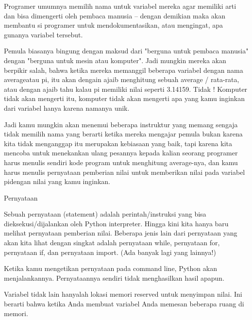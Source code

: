 \vspace{12pt}
\noindent 
Programer umumnya memilih nama untuk variabel mereka agar memiliki arti dan bisa dimengerti oleh pembaca manusia -- dengan demikian maka akan membantu si programer untuk mendokumentasikan, atau mengingat, apa gunanya variabel tersebut. \par
\vspace{12pt}
\vspace{12pt}
\noindent 
Pemula biasanya bingung dengan maksud dari "berguna untuk pembaca manusia" dengan "berguna untuk mesin atau komputer". Jadi mungkin mereka akan berpikir salah, bahwa ketika mereka memanggil beberapa variabel dengan nama $  $averageatau $  $pi, itu akan dengain ajaib menghitung sebuah average / rata-rata, atau dengan ajaib tahu kalau pi memiliki nilai seperti 3.14159. Tidak ! Komputer tidak akan mengerti itu, komputer tidak akan mengerti apa yang kamu inginkan dari variabel hanya karena namanya unik. \par
\vspace{12pt}
\noindent 
Jadi kamu mungkin akan menemui beberapa instruktur yang memang sengaja tidak memilih nama yang berarti ketika mereka mengajar pemula bukan karena kita tidak menganggap itu merupakan kebiasaan yang baik, tapi karena kita mencoba untuk menekankan ulang pesannya kepada kalian seorang programer  harus menulis sendiri kode program untuk menghitung average-nya, dan kamu harus menulis pernyataan pemberian nilai untuk memberikan nilai pada variabel $  $pidengan nilai yang kamu inginkan. \par
\vspace{12pt}
\noindent 
 Pernyataan \par
\vspace{12pt}
\noindent 
Sebuah $  $pernyataan $  $(statement) adalah perintah/instruksi yang bisa dieksekusi/dijalankan oleh Python interpreter. Hingga kini kita hanya baru melihat pernyataan pemberian nilai. Beberapa jenis lain dari pernyataan yang akan kita lihat dengan singkat adalah pernyataan $  $while, pernyataan $  $for, pernyataan $  $if, dan pernyataan $  $import. (Ada banyak lagi yang lainnya!) \par
\vspace{12pt}
\noindent 
Ketika kamu mengetikan pernyataan pada command line, Python akan menjalankannya. Pernyataannya sendiri tidak menghasilkan hasil apapun. \par
\vspace{12pt}
\noindent 
Variabel tidak lain hanyalah lokasi memori reserved untuk menyimpan nilai. $  $Ini berarti bahwa ketika Anda membuat variabel Anda memesan beberapa ruang di memori. \par

